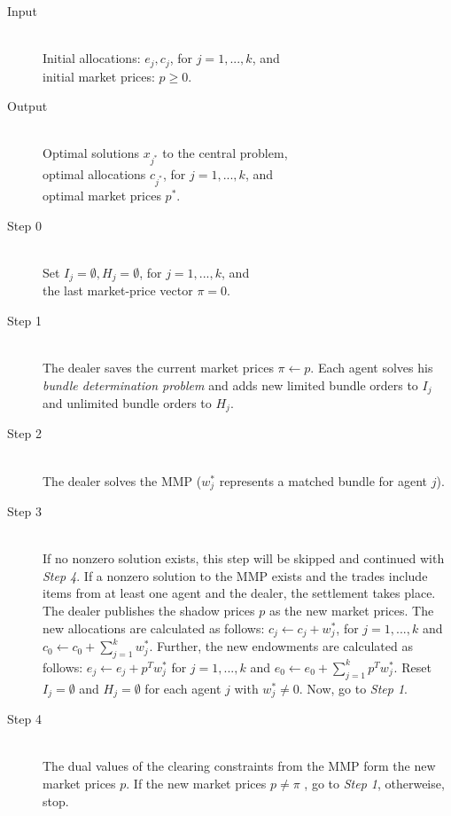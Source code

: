 \begin{description}
 \item[Input] \hfill \\
 Initial allocations: $e_{j}, c_{j}$, for $j=1,...,k$, and \\
 initial market prices: $p \geq 0$.
 \item[Output] \hfill \\
 Optimal solutions $x_{j^{*}}$ to the central problem, \\
 optimal allocations $c_{j^{*}}$, for $j=1,...,k$, and \\
 optimal market prices $p^{*}$.
 \item[Step 0] \hfill \\
 Set $I_{j} = \emptyset, H_{j} = \emptyset$, for $j=1,...,k$, and \\
 the last market-price vector $\pi = 0$.
 \item[Step 1] \hfill \\
 The dealer saves the current market prices $\pi \leftarrow p$. Each agent solves his 
 \textit{bundle determination problem} and adds new limited bundle orders to $I_{j}$ and 
 unlimited bundle orders to $H_{j}$.
 \item[Step 2] \hfill \\
 The dealer solves the MMP ($w_{j}^{*}$ represents a matched bundle for agent $j$). 
 \item[Step 3] \hfill \\
 If no nonzero solution exists, this step will be skipped and continued with \textit{Step 4}.
 If a nonzero solution to the MMP exists and the trades include items from at least one agent and the dealer, the settlement takes place. 
 The dealer publishes the shadow prices $p$ as the new market prices.
 The new allocations are calculated as follows:
 $c_{j} \leftarrow c_{j} + w_{j}^{*}$, for $j=1,...,k$ and $c_{0} \leftarrow c_{0} + \sum\limits_{j=1}^{k} w_{j}^{*}$.
 Further, the new endowments are calculated as follows:
 $e_{j} \leftarrow e_{j} + p^{T} w_{j}^{*}$ for $j=1,...,k$ and $e_{0} \leftarrow e_{0} + \sum\limits_{j=1}^{k} p^{T} w_{j}^{*}$.
 Reset $I_{j} = \emptyset$ and $H_{j} = \emptyset$ for each agent $j$ with $w_{j}^{*} \neq 0$.
 Now, go to \textit{Step 1}. 
 \item[Step 4] \hfill \\
 The dual values of the clearing constraints from the MMP form the new market prices $p$. 
 If the new market prices $p \neq \pi$ , go to \textit{Step 1}, otherweise, stop.
\end{description}


\clearpage